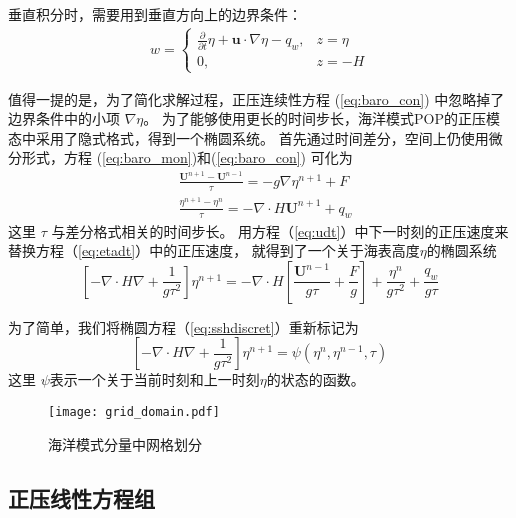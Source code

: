 垂直积分时，需要用到垂直方向上的边界条件：
\begin{align}
\label{eq:bound_w}
w = \left\{ \begin{array}{ll}
\frac{\partial}{\partial t} \eta  +\textbf{u}\cdot\nabla \eta - q_w, & z = \eta  \\
0, & z = -H
\end{array} \right.
\end{align}
 
值得一提的是，为了简化求解过程，正压连续性方程 (\ref{eq:baro_con}) 中忽略掉了边界条件中的小项 $\nabla \eta$\cite{smith2010parallel}。
为了能够使用更长的时间步长，海洋模式POP的正压模态中采用了隐式格式，得到一个椭圆系统。 
首先通过时间差分，空间上仍使用微分形式，方程  (\ref{eq:baro_mon})和(\ref{eq:baro_con}) 可化为
\begin{align}
&\displaystyle \frac{ \textbf{U}^{n+1} - \textbf{U}^{n-1}}{\tau}  = -g \nabla \eta^{n+1} + F \label{eq:udt} \\
&\displaystyle \frac{\eta^{n+1} - \eta^n }{\tau}  = - \nabla \cdot H\textbf{U} ^{n+1}+ q_w \label{eq:etadt}
\end{align}
这里 $\tau$ 与差分格式相关的时间步长。 
用方程（\ref{eq:udt}）中下一时刻的正压速度来替换方程（\ref{eq:etadt}）中的正压速度， 就得到了一个关于海表高度$\eta$的椭圆系统
\begin{equation}
\label{eq:sshdiscret}
     [-\nabla\cdot H \nabla + \frac{1}{g  \tau^2}]\eta^{n+1}
           = -\nabla\cdot H[\frac{\textbf{U}^{n-1}}{g \tau} + \frac{F}{g}] + \frac{\eta^n}{g\tau^2} +\frac{q_w}{g\tau}
\end{equation}
 
为了简单，我们将椭圆方程（\ref{eq:sshdiscret}）重新标记为
\begin{equation}
\label{eq:ssh}
[-\nabla \cdot H\nabla +\frac{1}{g  \tau^2}]\eta^{n+1} = \psi(\eta^n,\eta^{n-1},\tau)
\end{equation}
这里 $\psi$表示一个关于当前时刻和上一时刻$\eta$的状态的函数。
 

\begin{figure}%
\centering
\texttt{[image: grid\_domain.pdf]}
\caption[] {海洋模式分量中网格划分\label{fig:grid1}}
\end{figure}


 

\subsection{正压线性方程组}
\label{solver:baroproperty}

